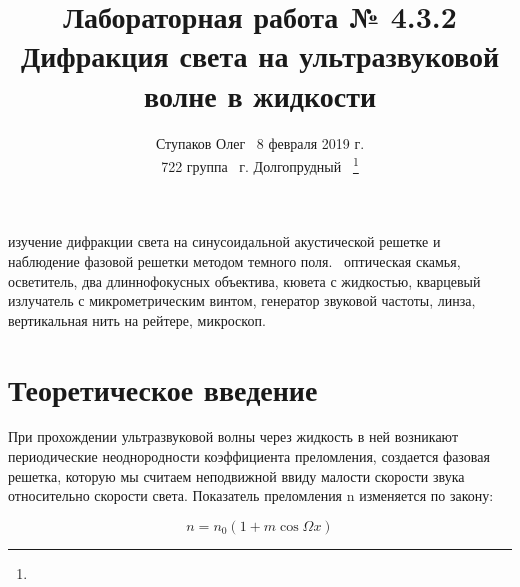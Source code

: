 \documentclass[journal, a4paper]{IEEEtran}
\begin{document}
	\title{{\large Лабораторная работа № 4.3.2}\\Дифракция света на ультразвуковой волне в
жидкости
}
	\author{Ступаков Олег \hspace{11cm} ~8 февраля 2019 г. \\ 722 группа 
	\hspace{11.71cm} ~г. Долгопрудный~
	\thanks{}}
	\maketitle



\section*{}
	 изучение дифракции света на синусоидальной акустической решетке и наблюдение фазовой решетки методом темного поля.\vspace{0.15cm}
	~оптическая скамья, осветитель, два длиннофокусных объектива, кювета с
жидкостью, кварцевый излучатель с микрометрическим винтом, генератор звуковой частоты,
линза, вертикальная нить на рейтере, микроскоп.
\section{Теоретическое введение}
	При прохождении ультразвуковой волны через жидкость в ней возникают периодические неоднородности коэффициента преломления, создается фазовая решетка, которую мы считаем неподвижной ввиду малости скорости звука относительно скорости света. Показатель
	преломления n изменяется по закону:
	
	\begin{equation}\label{}
	n = n_0 (1 + m \cos \Omega x)
	\end{equation}
	
\end{document}
